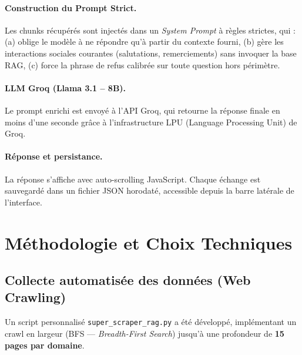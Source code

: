 \documentclass[12pt, a4paper]{article}
\begin{document}
\paragraph{Construction du Prompt Strict.}
Les chunks récupérés sont injectés dans un \emph{System Prompt} à règles strictes, qui : (a) oblige le modèle à ne répondre qu'à partir du contexte fourni, (b) gère les interactions sociales courantes (salutations, remerciements) sans invoquer la base RAG, (c) force la phrase de refus calibrée sur toute question hors périmètre.

\paragraph{LLM Groq (Llama 3.1 – 8B).}
Le prompt enrichi est envoyé à l'API Groq, qui retourne la réponse finale en moins d'une seconde grâce à l'infrastructure LPU (Language Processing Unit) de Groq.

\paragraph{Réponse et persistance.}
La réponse s'affiche avec auto-scrolling JavaScript. Chaque échange est sauvegardé dans un fichier JSON horodaté, accessible depuis la barre latérale de l'interface.

\section{Méthodologie et Choix Techniques}

\subsection{Collecte automatisée des données (Web Crawling)}

Un script personnalisé \texttt{super\_scraper\_rag.py} a été développé, implémentant un crawl en largeur (BFS — \emph{Breadth-First Search}) jusqu'à une profondeur de \textbf{15 pages par domaine}.
\end{document}
